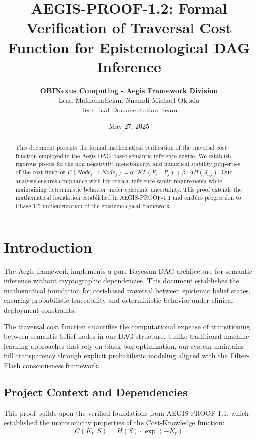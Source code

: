 \documentclass[11pt,a4paper]{article}
\title{\textbf{AEGIS-PROOF-1.2: Formal Verification of Traversal Cost Function for Epistemological DAG Inference}}
\author{
    \textbf{OBINexus Computing - Aegis Framework Division} \\
    Lead Mathematician: Nnamdi Michael Okpala \\
    Technical Documentation Team
}
\date{May 27, 2025}
\begin{document}
\maketitle

\begin{abstract}
This document presents the formal mathematical verification of the traversal cost function employed in the Aegis DAG-based semantic inference engine. We establish rigorous proofs for the non-negativity, monotonicity, and numerical stability properties of the cost function $C(Node_i \rightarrow Node_j) = \alpha \cdot KL(P_i \parallel P_j) + \beta \cdot \Delta H(S_{i,j})$. Our analysis ensures compliance with life-critical inference safety requirements while maintaining deterministic behavior under epistemic uncertainty. This proof extends the mathematical foundation established in AEGIS-PROOF-1.1 and enables progression to Phase 1.5 implementation of the epistemological framework.
\end{abstract}

\section{Introduction}

The Aegis framework implements a pure Bayesian DAG architecture for semantic inference without cryptographic dependencies. This document establishes the mathematical foundation for cost-based traversal between epistemic belief states, ensuring probabilistic traceability and deterministic behavior under clinical deployment constraints.

The traversal cost function quantifies the computational expense of transitioning between semantic belief nodes in our DAG structure. Unlike traditional machine learning approaches that rely on black-box optimization, our system maintains full transparency through explicit probabilistic modeling aligned with the Filter-Flash consciousness framework.

\subsection{Project Context and Dependencies}

This proof builds upon the verified foundations from AEGIS-PROOF-1.1, which established the monotonicity properties of the Cost-Knowledge function:
\begin{equation}
C(K_t, S) = H(S) \cdot \exp(-K_t)
\end{equation}
\end{document}
